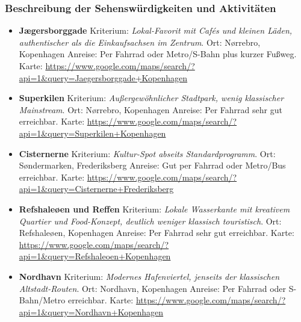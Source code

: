 \documentclass[a4paper,12pt]{article}
\begin{document}
\subsubsection{Beschreibung der Sehenswürdigkeiten und Aktivitäten}
\begin{itemize}
\item \textbf{Jægersborggade}\newline
Kriterium: \textit{Lokal-Favorit mit Cafés und kleinen Läden, authentischer als die Einkaufsachsen im Zentrum}.\newline
Ort: Nørrebro, Kopenhagen\newline
Anreise: Per Fahrrad oder Metro/S-Bahn plus kurzer Fußweg.\newline
Karte: \url{https://www.google.com/maps/search/?api=1&query=Jaegersborggade+Kopenhagen}

\item \textbf{Superkilen}\newline
Kriterium: \textit{Außergewöhnlicher Stadtpark, wenig klassischer Mainstream}.\newline
Ort: Nørrebro, Kopenhagen\newline
Anreise: Per Fahrrad sehr gut erreichbar.\newline
Karte: \url{https://www.google.com/maps/search/?api=1&query=Superkilen+Kopenhagen}

\item \textbf{Cisternerne}\newline
Kriterium: \textit{Kultur-Spot abseits Standardprogramm}.\newline
Ort: Søndermarken, Frederiksberg\newline
Anreise: Gut per Fahrrad oder Metro/Bus erreichbar.\newline
Karte: \url{https://www.google.com/maps/search/?api=1&query=Cisternerne+Frederiksberg}

\item \textbf{Refshaleøen und Reffen}\newline
Kriterium: \textit{Lokale Wasserkante mit kreativem Quartier und Food-Konzept, deutlich weniger klassisch touristisch}.\newline
Ort: Refshaleøen, Kopenhagen\newline
Anreise: Per Fahrrad sehr gut erreichbar.\newline
Karte: \url{https://www.google.com/maps/search/?api=1&query=Refshaleoen+Kopenhagen}

\item \textbf{Nordhavn}\newline
Kriterium: \textit{Modernes Hafenviertel, jenseits der klassischen Altstadt-Routen}.\newline
Ort: Nordhavn, Kopenhagen\newline
Anreise: Per Fahrrad oder S-Bahn/Metro erreichbar.\newline
Karte: \url{https://www.google.com/maps/search/?api=1&query=Nordhavn+Kopenhagen}


\end{itemize}
\end{document}
